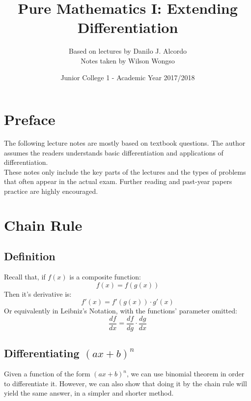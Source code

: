 \documentclass[hidelinks, a4paper, 12pt]{article}
\title{Pure Mathematics I: Extending Differentiation}
\author{Based on lectures by Danilo J. Alcordo \\ Notes taken by Wilson Wongso}
\date{Junior College 1 - Academic Year 2017/2018}
\begin{document}
    

    \maketitle
        
    \tableofcontents

    \section{Preface}
        The following lecture notes are mostly based on textbook \cite{neill2016cambridge} questions. The author assumes the readers understands basic differentiation and applications of differentiation.\\[\baselineskip]
        These notes only include the key parts of the lectures and the types of problems that often appear in the actual exam.
        Further reading and past-year papers practice are highly encouraged.

    \section{Chain Rule}
        \subsection{Definition}
            Recall that, if $f(x)$ is a composite function:
            \[f(x) = f(g(x))\]
            Then it's derivative is:
            \[f'(x) = f'(g(x)) \cdot g'(x)\]
            Or equivalently in Leibniz's Notation, with the functions' parameter omitted:
            \[\frac{df}{dx} = \frac{df}{dg} \cdot \frac{dg}{dx}\]

        \subsection{Differentiating \texorpdfstring{$(ax+b)^n$}{(ax+b)^n}}
            Given a function of the form $(ax+b)^n$, we can use binomial theorem in order to differentiate it. However, we can also show that doing it by the 
            chain rule will yield the same answer, in a simpler and shorter method.
\end{document}
